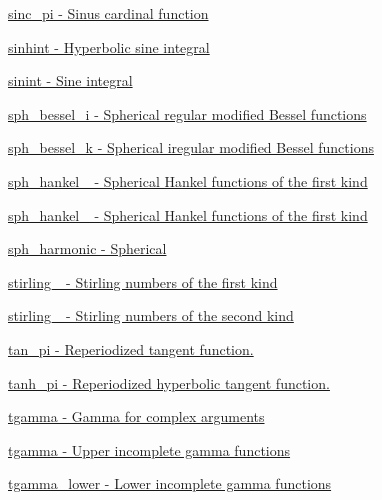 \begin{DoxyItemize}
\item \hyperlink{group__gnu__math__spec__func_ga5195270024403b985e7d4f2f935f8779}{sinc\+\_\+pi -\/ Sinus cardinal function}
\item \hyperlink{group__gnu__math__spec__func_gab5cbc831c5fab99a967c03d059f1ad59}{sinhint -\/ Hyperbolic sine integral}
\item \hyperlink{group__gnu__math__spec__func_ga076c8d52588904f5711c41781f8acfa0}{sinint -\/ Sine integral}
\item \hyperlink{group__gnu__math__spec__func_ga156b8154b27b7898c8b2abf4284f7323}{sph\+\_\+bessel\+\_\+i -\/ Spherical regular modified Bessel functions}
\item \hyperlink{group__gnu__math__spec__func_ga288b28f2c6995d052a4f5f17293cbf1a}{sph\+\_\+bessel\+\_\+k -\/ Spherical iregular modified Bessel functions}
\item \hyperlink{group__gnu__math__spec__func_ga4424f565fb224ab88b177beb65d08305}{sph\+\_\+hankel\+\_ -\/ Spherical Hankel functions of the first kind}
\item \hyperlink{group__gnu__math__spec__func_ga1ca08866a25e3637b04c57ff5a0c36a5}{sph\+\_\+hankel\+\_ -\/ Spherical Hankel functions of the first kind}
\item \hyperlink{group__gnu__math__spec__func_gacbff28988d5d36f0c3b3fe03d4f57896}{sph\+\_\+harmonic -\/ Spherical}
\item \hyperlink{group__gnu__math__spec__func_ga2b955dac7d2c5125f2091eaeb25c8ad2}{stirling\+\_ -\/ Stirling numbers of the first kind}
\item \hyperlink{group__gnu__math__spec__func_ga3761c0e467cbe45cbda66a4e796adcd3}{stirling\+\_ -\/ Stirling numbers of the second kind}
\item \hyperlink{group__gnu__math__spec__func_ga12855bd62fe6a955ef0d1d5e92c85ba9}{tan\+\_\+pi -\/ Reperiodized tangent function.}
\item \hyperlink{group__gnu__math__spec__func_ga8729ffd5acf3266315e9dac1b5a9b3a6}{tanh\+\_\+pi -\/ Reperiodized hyperbolic tangent function.}
\item \hyperlink{group__gnu__math__spec__func_ga73a634663e4eceb1e6bcf3fc16773b7b}{tgamma -\/ Gamma for complex arguments}
\item \hyperlink{group__gnu__math__spec__func_ga73a634663e4eceb1e6bcf3fc16773b7b}{tgamma -\/ Upper incomplete gamma functions}
\item \hyperlink{group__gnu__math__spec__func_gaed107908dec8865ea48e7764f7ea88a2}{tgamma\+\_\+lower -\/ Lower incomplete gamma functions}

\end{DoxyItemize}
